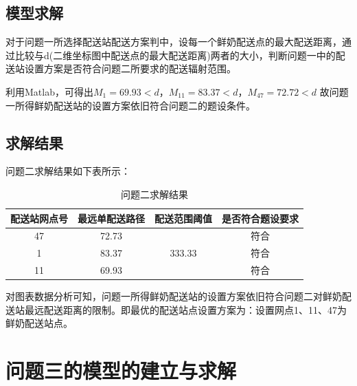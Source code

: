 \documentclass[withoutpreface,bwprint]{cumcmthesis} %
\begin{document}
	
	
	\subsection{模型求解}
对于问题一所选择配送站配送方案判中，设每一个鲜奶配送点的最大配送距离，通过比较与d(二维坐标图中配送点的最大配送距离)两者的大小，判断问题一中的配送站设置方案是否符合问题二所要求的配送辐射范围。

利用Matlab，可得出${{M}_{1}}=69.93<d$，${{M}_{11}}=83.37<d$，${{M}_{47}}=72.72<d$
	故问题一所得鲜奶配送站的设置方案依旧符合问题二的题设条件。
	
	\subsection{求解结果}
问题二求解结果如下表所示：

\begin{table}[h]
	\centering
	\caption{问题二求解结果}
	\begin{tabular}{cccc} 
		\hline
		配送站网点号 & 最远单配送路径 & 配送范围阈值                  & 是否符合题设要求  \\ 
		\hline
		47     & 72.73   & \multirow{3}{*}{333.33} & 符合        \\
		1      & 83.37   &                         & 符合        \\
		11     & 69.93   &                         & 符合        \\
		\hline
	\end{tabular}
\end{table}

对图表数据分析可知，问题一所得鲜奶配送站的设置方案依旧符合问题二对鲜奶配送站最远配送距离的限制。即最优的配送站点设置方案为：设置网点1、11、47为鲜奶配送站点。

\section{问题三的模型的建立与求解}
\end{document}
